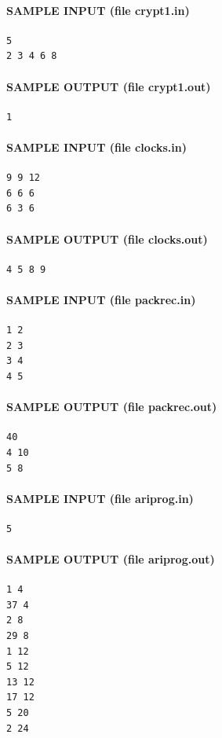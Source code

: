 \documentclass[11pt]{article}
\begin{document}
\paragraph{SAMPLE INPUT (file crypt1.in)}
\begin{verbatim}
5
2 3 4 6 8
\end{verbatim}

\paragraph{SAMPLE OUTPUT (file crypt1.out)}
\begin{verbatim}
1
\end{verbatim}

\paragraph{SAMPLE INPUT (file clocks.in)}
\begin{verbatim}
9 9 12
6 6 6
6 3 6
\end{verbatim}

\paragraph{SAMPLE OUTPUT (file clocks.out)}
\begin{verbatim}
4 5 8 9
\end{verbatim}

\paragraph{SAMPLE INPUT (file packrec.in)}
\begin{verbatim}
1 2
2 3
3 4
4 5
\end{verbatim}

\paragraph{SAMPLE OUTPUT (file packrec.out)}
\begin{verbatim}
40
4 10
5 8
\end{verbatim}

\paragraph{SAMPLE INPUT (file ariprog.in)}
\begin{verbatim}
5
\end{verbatim}

\paragraph{SAMPLE OUTPUT (file ariprog.out)}
\begin{verbatim}
1 4
37 4
2 8
29 8
1 12
5 12
13 12
17 12
5 20
2 24
\end{verbatim}
\end{document}
